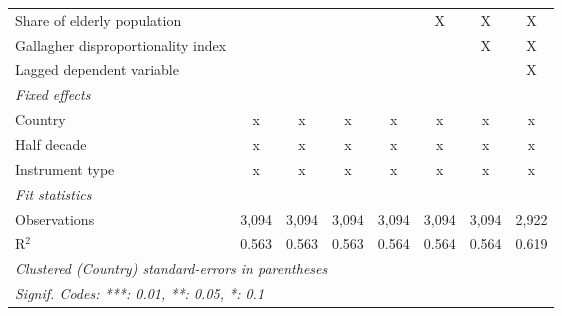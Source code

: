 \begin{tabular}{lccccccc}
   Share of elderly population                                               &              &              &              &              & X            & X            & X\\  
   Gallagher disproportionality index                                        &              &              &              &              &              & X            & X\\  
   Lagged dependent variable                                                 &              &              &              &              &              &              & X\\  
   \emph{Fixed effects}\\
   Country                                                                   & x            & x            & x            & x            & x            & x            & x\\  
   Half decade                                                               & x            & x            & x            & x            & x            & x            & x\\  
   Instrument type                                                           & x            & x            & x            & x            & x            & x            & x\\  
   \midrule \emph{Fit statistics}\\
   Observations                                                              & 3,094        & 3,094        & 3,094        & 3,094        & 3,094        & 3,094        & 2,922\\  
   R$^2$                                                                     & 0.563        & 0.563        & 0.563        & 0.564        & 0.564        & 0.564        & 0.619\\  
   \midrule
   \multicolumn{8}{l}{\emph{Clustered (Country) standard-errors in parentheses}}\\
   \multicolumn{8}{l}{\emph{Signif. Codes: ***: 0.01, **: 0.05, *: 0.1}}\\
\end{tabular}
\par\endgroup


